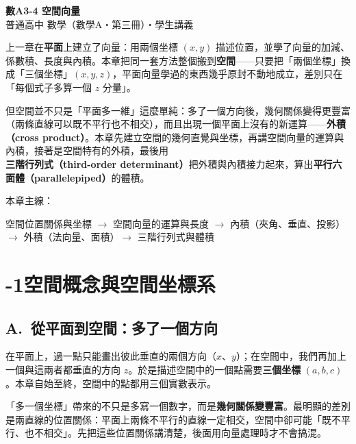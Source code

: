 \documentclass[11pt]{article}
\begin{document}
\begin{center}
{\sffamily\Huge\bfseries 數A3-4 空間向量}\\[3pt]
{\sffamily\large 普通高中 數學（數學A・第三冊）・學生講義}
\end{center}
\vspace{0.6em}

上一章在\textbf{平面}上建立了向量：用兩個坐標 $(x,y)$ 描述位置，並學了向量的加減、係數積、長度與內積。本章把同一套方法整個搬到\textbf{空間}——只要把「兩個坐標」換成「三個坐標」$(x,y,z)$，平面向量學過的東西幾乎原封不動地成立，差別只在「每個式子多算一個 $z$ 分量」。

但空間並不只是「平面多一維」這麼單純：多了一個方向後，幾何關係變得更豐富（兩條直線可以既不平行也不相交），而且出現一個平面上沒有的新運算——\textbf{外積（cross product）}。本章先建立空間的幾何直覺與坐標，再講空間向量的運算與內積，接著是空間特有的外積，最後用\textbf{三階行列式（third-order determinant）}把外積與內積接力起來，算出\textbf{平行六面體（parallelepiped）}的體積。

\medskip
本章主線：

\begin{center}
空間位置關係與坐標 $\rightarrow$ 空間向量的運算與長度 $\rightarrow$ 內積（夾角、垂直、投影）$\rightarrow$ 外積（法向量、面積）$\rightarrow$ 三階行列式與體積
\end{center}

\section*{-1\quad 空間概念與空間坐標系}

\subsection*{\sffamily A.\ 從平面到空間：多了一個方向}

在平面上，過一點只能畫出彼此垂直的兩個方向（$x$、$y$）；在空間中，我們再加上一個與這兩者都垂直的方向 $z$。於是描述空間中的一個點需要\textbf{三個坐標} $(a,b,c)$。本章自始至終，空間中的點都用三個實數表示。

「多一個坐標」帶來的不只是多寫一個數字，而是\textbf{幾何關係變豐富}。最明顯的差別是兩直線的位置關係：平面上兩條不平行的直線一定相交，空間中卻可能「既不平行、也不相交」。先把這些位置關係講清楚，後面用向量處理時才不會搞混。
\end{document}
